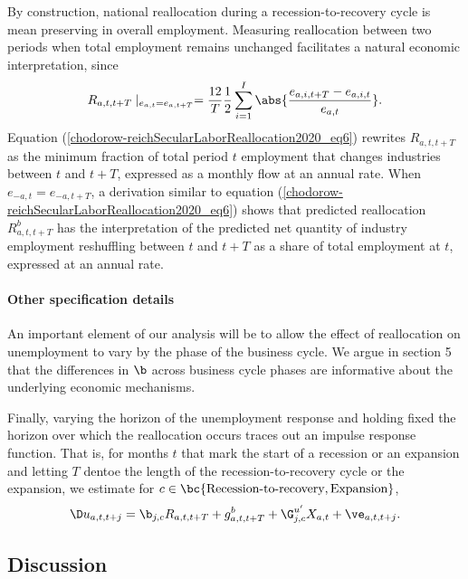 \documentclass[12pt]{article}
\theoremstyle{definition}
\begin{document}
By construction, national reallocation during a recession-to-recovery cycle is mean preserving in overall employment. Measuring reallocation between two periods when total employment remains unchanged facilitates a natural economic interpretation, since 
\begin{equation}
    \label{chodorow-reichSecularLaborReallocation2020_eq6}
    R_{a, t, t+T} \mid_{e_{a,t} = e_{a, t+T}} = \frac{12}{T} \frac{1}{2} \sum_{i=1}^{I} \abs{\frac{e_{a, i, t+T} - e_{a, i, t}}{e_{a, t}}}.
\end{equation}
Equation (\ref{chodorow-reichSecularLaborReallocation2020_eq6}) rewrites $R_{a, t, t+T}$ as the minimum fraction of total period $t$ employment that changes industries between $t$ and $t+T$, expressed as a monthly flow at an annual rate. When ${e_{-a,t} = e_{-a, t+T}}$, a derivation similar to equation (\ref{chodorow-reichSecularLaborReallocation2020_eq6}) shows that predicted reallocation $R^b_{a, t, t+T}$ has the interpretation of the predicted net quantity of industry employment reshuffling between $t$ and $t+T$ as a share of total employment at $t$, expressed at an annual rate. 


\paragraph{Other specification details} An important element of our analysis will be to allow the effect of reallocation on unemployment to vary by the phase of the business cycle. We argue in section 5 that the differences in $\b$ across business cycle phases are informative about the underlying economic mechanisms.

Finally, varying the horizon of the unemployment response and holding fixed the horizon over which the reallocation occurs traces out an impulse response function. That is, for months $t$ that mark the start of a recession or an expansion and letting $T$ dentoe the length of the recession-to-recovery cycle or the expansion, we estimate for $c \in \bc{\text{Recession-to-recovery}, \text{Expansion}}$,
\begin{equation}
    \label{chodorow-reichSecularLaborReallocation2020_eq7}
    \D u_{a, t, t+j} = \b_{j, c} R_{a, t, t+T} + g_{a, t, t+T}^b + \G_{j, c}^{u^{\prime}} X_{a, t} + \ve_{a, t, t+j}.
\end{equation}

\subsection{Discussion}
\end{document}
